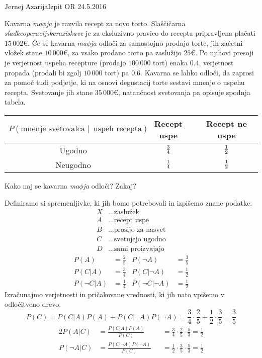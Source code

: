 \begin{naloga}{Jernej Azarija}{Izpit OR 24.5.2016}
\begin{vprasanje}
Kavarna {\em ma$\phi$ja} je razvila recept za novo torto.
Slaščičarna {\em sladkeoperacijskeraziskave}
je za eksluzivno pravico do recepta pripravljena plačati $15\,002 €$.
Če se kavarna {\em ma$\phi$ja} odloči za samostojno prodajo torte,
jih začetni vložek stane $10\,000 €$,
za vsako prodano torto pa zaslužijo $25 €$.
Po njihovi presoji
je verjetnost uspeha recepture (prodajo $100\,000$ tort) enaka $0.4$,
verjetnost propada (prodali bi zgolj $10\,000$ tort) pa $0.6$.
Kavarna se lahko odloči, da zaprosi za pomoč tudi pod\-jet\-je,
ki na osnovi degustacij torte sestavi mnenje o uspehu recepta.
Svetovanje jih stane $35\,000 €$,
natančnost svetovanja pa opisuje spodnja tabela.
\begin{center}
\begin{tabular}{c|cc}
$P(\text{mnenje svetovalca} \;|\;\ \text{uspeh recepta})$
& Recept uspe & Recept ne uspe \\ \hline
Ugodno   & ${3 \over 4}$ & ${1 \over 2}$ \\
Neugodno & ${1 \over 4}$ & ${1 \over 2}$
\end{tabular}
\end{center}
Kako naj se kavarna {\em ma$\phi$ja} odloči?
Zakaj?
\end{vprasanje}
\begin{odgovor}

Definiramo si spremenljivke, ki jih bomo potrebovali in izpišemo znane podatke.
\begin{align*}
X &\dots \text{zaslužek}\\
A &\dots \text{recept uspe}\\
B &\dots \text{prosijo za nasvet}\\
C &\dots \text{svetujejo ugodno}\\
D &\dots \text{sami proizvajajo}
\end{align*}
\begin{align*}
P(A) &= \frac{2}{5} & P(\neg A)& = \frac{3}{5}\\
P(C|A)& = \frac{3}{4}  &P(C|\neg A) &= \frac{1}{2}\\
P(\neg C|A) &= \frac{1}{4}  &P(\neg C| \neg A) &= \frac{1}{2}
\end{align*}
Izračunajmo verjetnosti in pričakovane vrednosti, ki jih nato vpišemo v odločitveno drevo.
$$
P(C) = P(C|A) P(A) + P(C|\neg A) P(\neg A) =\frac{3}{4}\cdot \frac{2}{5} + \frac{1}{2}\cdot \frac{3}{5} = \frac{3}{5}
$$
\begin{alignat*}{2}
P(A|C) &= \frac{P(C|A)P(A)}{P(C)} &&= \frac{3}{4}\cdot \frac{2}{5}\cdot \frac{5}{3}=\frac{1}{2}\\
P(\neg A|C) &= \frac{P(C|\neg A)P(\neg A)}{P(C)} &&= \frac{1}{2}\cdot \frac{3}{5}\cdot \frac{5}{3}= \frac{1}{2}
\end{alignat*}


\end{odgovor}
\end{naloga}
